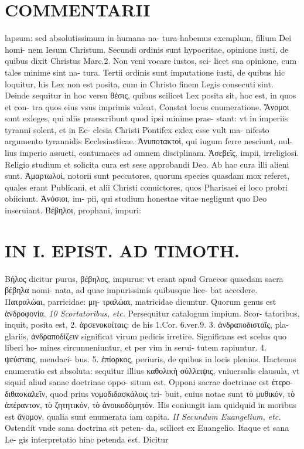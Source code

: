 \documentclass{article}
\begin{document}
\begin{pages}
\section*{COMMENTARII }\pstart lapsum: sed absolutissimum in humana na- tura habemus exemplum, filium Dei homi- nem Iesum Christum. Secundi ordinis sunt hypocritae, opinione iusti, de quibus dixit Christus Marc.2. Non veni vocare iustos, sci- licet sua opinione, cum tales minime sint na- tura. Tertii ordinis sunt imputatione iusti, de quibus hic loquitur, his Lex non est posita, cum in Christo finem Legis consecuti sint.  \pend\pstart Deinde sequitur in hoc versu θέσις, quibus scilicet Lex posita sit, hoc est, in quos et con- tra quos eius vsus imprimis valeat. Constat locus enumeratione. Ἄνομοι sunt exleges, qui aliis praescribunt quod ipsi minime prae- stant: vt in imperiis tyranni solent, et in Ec- clesia Christi Pontifex exlex esse vult ma- nifesto argumento tyrannidis Ecclesiasticae.  \pend\pstart Ἀνυποτακτοὶ, qui iugum ferre nesciunt, nul- lius imperio assueti, contumaces ad omnem disciplinam.  \pend\pstart Ἀσεβεῖς, impii, irreligiosi. Religio studium et solicita cura est sese approbandi Deo. Ab hac cura illi alieni sunt.  \pend\pstart Ἁμαρτωλοὶ, notorii sunt peccatores, quorum species quasdam mox referet, quales erant Publicani, et alii Christi conuictores, quos Pharisaei ei loco probri obiiciunt. Ἀνόσιοι, im- pii, qui studium honestae vitae negligunt quo Deo inseruiant. Βέβηλοι, prophani, impuri:  \pend
\section*{IN I. EPIST. AD TIMOTH. }
\marginpar{[ p.29 ]}\pstart Βήλος dicitur purus, βέβηλος, impurus: vt erant apud Graecos quaedam sacra βέβηλα nomi- nata, ad quae impurissimis quibusque lice- bat accedere. Πατραλώαι, parricidae: μη- τραλώαι, matricidae dicuntur. Quorum genus est ἀνδροφονία.  \pend
\textit{10 Scortatoribus, etc. }\pstart Persequitur catalogum impium. Scor- tatoribus, inquit, posita est, 2. ἀρσενοκοίταις: de his 1.Cor. 6.ver.9. 3. ἀνδραποδισταῖς, pla- glariis, ἀνδραποδίζειν significat virum pedicis irretire. Significans est scelus quo liberi ho- mines circunueniuntur, et per vim in serui- tutem rapiuntur. 4. ψεύσταις, mendaci- bus. 5. ἐπίορκος, periuris, de quibus in locis plenius. Hactenus enumeratio est absoluta: sequitur illius καθολικὴ σύλλειψις, vniuersalis clausula, vt siquid aliud sanae doctrinae oppo- situm est. Opponi sacrae doctrinae est ἑτερο- διθασκαλεῖν, quod prius νομοδιδασκάλοις tri- buit, cuius notae sunt τὸ μυθικόν, τὸ ἀπέραντον, τὸ  ζητητικόν, τὸ ἀνοικοδόμητόν. His coniungit iam quidquid in moribus est ἄνομον, qualia sunt enumerata iam capita.  \pend
\textit{II Secundum Euangelium, etc. }\pstart Ostendit vnde sana doctrina sit peten- da, scilicet ex Euangelio. Itaque et sana Le- gis interpretatio hinc petenda est. Dicitur  \pend
\marginpar{[ p.30 ]}

\end{pages}
\end{document}
